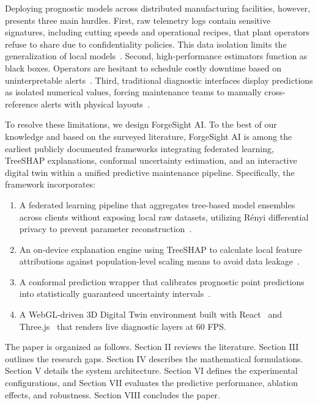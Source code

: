 \documentclass[letterpaper, 10 pt, conference]{ieeeconf}
\begin{document}
Deploying prognostic models across distributed manufacturing facilities, however, presents three main hurdles.
First, raw telemetry logs contain sensitive signatures, including cutting speeds and operational recipes, that plant operators refuse to share due to confidentiality policies. This data isolation limits the generalization of local models~\cite{kairouz2021,yang2019fl}.
Second, high-performance estimators function as black boxes. Operators are hesitant to schedule costly downtime based on uninterpretable alerts~\cite{dosivelez2017,arrieta2020}.
Third, traditional diagnostic interfaces display predictions as isolated numerical values, forcing maintenance teams to manually cross-reference alerts with physical layouts~\cite{vandinter2022}.

To resolve these limitations, we design ForgeSight AI. To the best of our knowledge and based on the surveyed literature, ForgeSight AI is among the earliest publicly documented frameworks integrating federated learning, TreeSHAP explanations, conformal uncertainty estimation, and an interactive digital twin within a unified predictive maintenance pipeline. Specifically, the framework incorporates:
\begin{enumerate}
  \item A federated learning pipeline that aggregates tree-based model ensembles across clients without exposing local raw datasets, utilizing Rényi differential privacy to prevent parameter reconstruction~\cite{mcmahan2017}.
  \item An on-device explanation engine using TreeSHAP to calculate local feature attributions against population-level scaling means to avoid data leakage~\cite{lundberg2017}.
  \item A conformal prediction wrapper that calibrates prognostic point predictions into statistically guaranteed uncertainty intervals~\cite{vovk2008,angelopoulos2021}.
  \item A WebGL-driven 3D Digital Twin environment built with React~\cite{react} and Three.js~\cite{threejs} that renders live diagnostic layers at 60 FPS.
\end{enumerate}

The paper is organized as follows. Section II reviews the literature. Section III outlines the research gaps. Section IV describes the mathematical formulations. Section V details the system architecture. Section VI defines the experimental configurations, and Section VII evaluates the predictive performance, ablation effects, and robustness. Section VIII concludes the paper.
\end{document}
